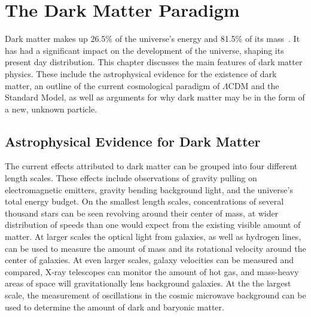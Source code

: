 \cleartooddpage[\thispagestyle{empty}]
\newcommand{\thetamc}{\theta_{\textrm{MC}}}
\newcommand{\mlratio}{$\left [ \frac{M_\odot}{L_\odot} \right ]$}
\chapter{The Dark Matter Paradigm}\label{ch_dm}

Dark matter makes up 26.5\% of the universe's energy and 81.5\% of its mass~\cite{planck2015}.
It has had a significant impact on the development of the universe, shaping its present day distribution.
This chapter discusses the main features of dark matter physics.
These include the astrophysical evidence for the existence of dark matter, an outline of the current cosmological paradigm of $\Lambda$CDM and the Standard Model, as well as arguments for why dark matter may be in the form of a new, unknown particle.


\section{Astrophysical Evidence for Dark Matter}
  
The current effects attributed to dark matter can be grouped into four different length scales.
These effects include observations of gravity pulling on electromagnetic emitters, gravity bending background light, and the universe's total energy budget.
On the smallest length scales, concentrations of several thousand stars can be seen revolving around their center of mass, at wider distribution of speeds than one would expect from the existing visible amount of matter.
At larger scales the optical light from galaxies, as well as hydrogen lines, can be used to measure the amount of mass and its rotational velocity around the center of galaxies.
At even larger scales, galaxy velocities can be measured and compared, X-ray telescopes can monitor the amount of hot gas, and mass-heavy areas of space will gravitationally lens background galaxies.
At the the largest scale, the measurement of oscillations in the cosmic microwave background can be used to determine the amount of dark and baryonic matter.
  
